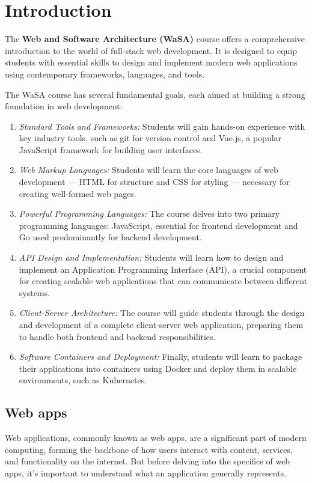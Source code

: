 \chapter{Introduction}

\begin{redbar}
The \textbf{Web and Software Architecture (WaSA)} course offers a comprehensive introduction to the world of full-stack web development. It is designed to equip students with essential skills to design and implement modern web applications using contemporary frameworks, languages, and tools.
\end{redbar}

The WaSA course has several fundamental goals, each aimed at building a strong foundation in web development:
\begin{enumerate}
    \item \textit{Standard Tools and Frameworks:} Students will gain hands-on experience with key industry tools, such as git for version control and Vue.js, a popular JavaScript framework for building user interfaces.
    \item \textit{Web Markup Languages:} Students will learn the core languages of web development — HTML for structure and CSS for styling — necessary for creating well-formed web pages.
    \item \textit{Powerful Programming Languages:} The course delves into two primary programming languages: JavaScript, essential for frontend development and Go used predominantly for backend development.
    \item \textit{API Design and Implementation:} Students will learn how to design and implement an Application Programming Interface (API), a crucial component for creating scalable web applications that can communicate between different systems.    
    \item \textit{Client-Server Architecture:} The course will guide students through the design and development of a complete client-server web application, preparing them to handle both frontend and backend responsibilities.
    \item \textit{Software Containers and Deployment:} Finally, students will learn to package their applications into containers using Docker and deploy them in scalable environments, such as Kubernetes.
\end{enumerate}

\section{Web apps}
Web applications, commonly known as web apps, are a significant part of modern computing, forming the backbone of how users interact with content, services, and functionality on the internet. But before delving into the specifics of web apps, it’s important to understand what an application generally represents.

